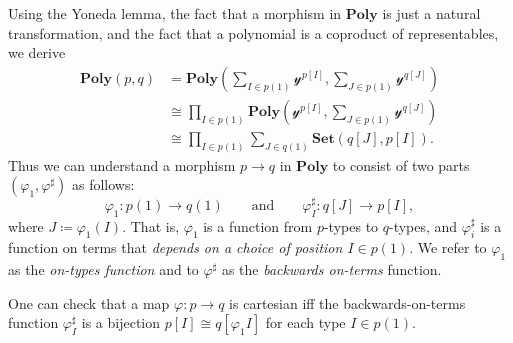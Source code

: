 \documentclass[11pt, one side, article]{memoir}
\theoremstyle{definition}
\theoremstyle{plain}
\newenvironment{remark}
  {\pushQED{\qed}\renewcommand{\qedsymbol}{$\lozenge$}\remarkx}
  {\popQED\endremarkx}
\newcommand{\Cat}[1]{\mathbf{#1}}%
\newcommand{\smset}{\Cat{Set}}
\newcommand{\yon}{\mathcal{y}}
\newcommand{\poly}{\Cat{Poly}}
\newcommand{\0}{\textsf{0}}
\newcommand{\1}{\tn{\textsf{1}}}
\newcommand{\qqand}{\qquad\text{and}\qquad}
\begin{document}
\begin{remark}\label{rem.positions_and_directions}
Using the Yoneda lemma, the fact that a morphism in $\poly$ is just a natural transformation, and the fact that a polynomial is a coproduct of representables, we derive
\begin{align*}
	\poly(p,q)&=
	\poly\left(\sum_{I\in p(1)}\yon^{p[I]},\sum_{J\in p(1)}\yon^{q[J]}\right)\\&\cong
	\prod_{I\in p(1)}\poly\left(\yon^{p[I]},\sum_{J\in p(1)}\yon^{q[J]}\right)\\&\cong
	\prod_{I\in p(1)}\sum_{J\in q(1)}\smset(q[J],p[I]).
\end{align*}
Thus we can understand a morphism $p\to q$ in $\poly$ to consist of two parts $(\varphi_1,\varphi^\sharp)$ as follows:
\begin{equation}\label{eqn.mapsharp}
  \varphi_1\colon p(1)\to q(1)
  \qqand
  \varphi^\sharp_I\colon q[J]\to p[I],
\end{equation}
where $J\coloneqq\varphi_1(I)$. That is, $\varphi_1$ is a function from $p$-types to $q$-types, and $\varphi^\sharp_i$ is a function on terms that \emph{depends on a choice of position $I\in p(1)$}. We refer to $\varphi_1$ as the \emph{on-types function} and to $\varphi^\sharp$ as the \emph{backwards on-terms} function. 

One can check that a map $\varphi\colon p\to q$ is cartesian iff the backwards-on-terms function $\varphi^\sharp_I$ is a bijection $p[I]\cong q[\varphi_1I]$ for each type $I\in p(1)$.
\end{remark}
\end{document}
